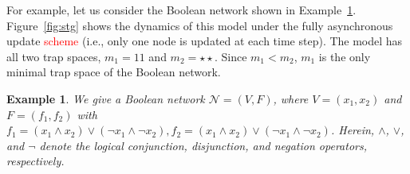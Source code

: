 \documentclass[preprint,12pt]{elsarticle}
\newtheorem{example}{Example}[section]
\newcommand{\change}[1]{\textcolor{red}{#1}}
\begin{document}
For example, let us consider the Boolean network shown in Example~\ref{example:BN}.
Figure~\ref{fig:stg} shows the dynamics of this model under the fully asynchronous update \change{scheme} (i.e., only one node is updated at each time step).
The model has all two trap spaces, \(m_1 = 11\) and \(m_2 = \star\star\).
Since \(m_1 < m_2\), \(m_1\) is the only minimal trap space of the Boolean network.

\begin{example}
We give a Boolean network \(\mathcal{N} = (V, F)\), where \(V = (x_1, x_2)\) and \(F = (f_1, f_2)\) with \(f_1 = (x_1 \land x_2) \lor (\neg x_1 \land \neg x_2), f_2 = (x_1 \land x_2) \lor (\neg x_1 \land \neg x_2)\). Herein, \(\land\), \(\lor\), and \(\neg\) denote the logical conjunction, disjunction, and negation operators, respectively.\label{example:BN}
\end{example}
\end{document}
